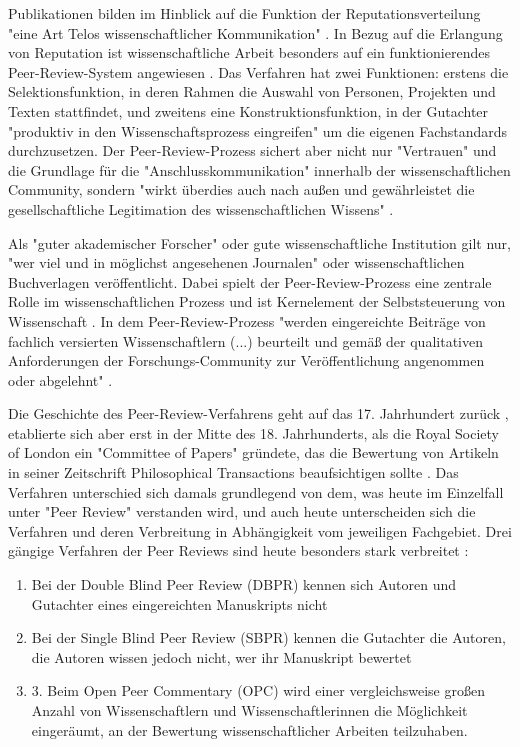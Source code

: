 Publikationen bilden im Hinblick auf die Funktion der Reputationsverteilung "eine Art Telos wissenschaftlicher Kommunikation" \cite{hirschauer2004peer}. In Bezug auf die Erlangung von Reputation ist wissenschaftliche Arbeit besonders auf ein funktionierendes Peer-Review-System angewiesen \cite{Luescher_2014}. Das Verfahren hat zwei Funktionen: erstens die Selektionsfunktion, in deren Rahmen die Auswahl von Personen, Projekten und Texten stattfindet, und zweitens eine Konstruktionsfunktion, in der Gutachter "produktiv in den Wissenschaftsprozess eingreifen" \cite{Neidhardt_2010} um die eigenen Fachstandards durchzusetzen. Der Peer-Review-Prozess sichert aber nicht nur "Vertrauen" und die Grundlage für die "Anschlusskommunikation" innerhalb der wissenschaftlichen Community, sondern "wirkt überdies auch nach außen und gewährleistet die gesellschaftliche Legitimation des wissenschaftlichen Wissens" \cite{pscheida_2010_wikipedia}.

Als "guter akademischer Forscher" oder gute wissenschaftliche Institution gilt nur, "wer viel und in möglichst angesehenen Journalen" \cite{Frey_2005} oder wissenschaftlichen Buchverlagen veröffentlicht. Dabei spielt der Peer-Review-Prozess eine zentrale Rolle im wissenschaftlichen Prozess \cite{smith_1999_opening} und ist Kernelement der Selbststeuerung von Wissenschaft \cite[:5]{Neidhardt_2010}. In dem Peer-Review-Prozess "werden eingereichte Beiträge von fachlich versierten Wissenschaftlern (...) beurteilt und gemäß der qualitativen Anforderungen der Forschungs-Community zur Veröffentlichung angenommen oder abgelehnt" \cite{Hess_2006}.

Die Geschichte des Peer-Review-Verfahrens geht auf das 17. Jahrhundert zurück \cite{Kronick_1978}, etablierte sich aber erst in der Mitte des 18. Jahrhunderts, als die Royal Society of London ein "Committee of Papers" gründete, das die Bewertung von Artikeln in seiner Zeitschrift Philosophical Transactions beaufsichtigen sollte \cite{Kronick_1990}. Das Verfahren unterschied sich damals grundlegend von dem, was heute im Einzelfall unter "Peer Review" verstanden wird, und auch heute unterscheiden sich die Verfahren und deren Verbreitung in Abhängigkeit vom jeweiligen Fachgebiet. Drei gängige Verfahren der Peer Reviews sind heute besonders stark verbreitet \cite{mueller_2009_peerreview}:
\begin{enumerate}
\item Bei der Double Blind Peer Review (DBPR) kennen sich Autoren und Gutachter eines eingereichten Manuskripts nicht
\item Bei der Single Blind Peer Review (SBPR) kennen die Gutachter die Autoren, die Autoren wissen jedoch nicht, wer ihr Manuskript bewertet
\item 3.	Beim Open Peer Commentary (OPC) wird einer vergleichsweise großen Anzahl von Wissenschaftlern und Wissenschaftlerinnen die Möglichkeit eingeräumt, an der Bewertung wissenschaftlicher Arbeiten teilzuhaben.
\end{enumerate}


